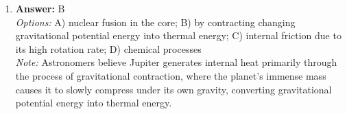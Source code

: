 \documentclass[12pt]{article}
\begin{document}
\begin{enumerate}[label=\arabic*.]
\\ \textit{Note:} Jupiter's magnetic field does not switch polarity every 11 years; instead, it has a stable magnetic field that differs from the solar magnetic cycle, which is characterized by the Sun's magnetic field reversing approximately every 11 years.
\item \textbf{Answer:} B
\\ \textit{Options:} A) nuclear fusion in the core; B) by contracting changing gravitational potential energy into thermal energy; C) internal friction due to its high rotation rate; D) chemical processes
\\ \textit{Note:} Astronomers believe Jupiter generates internal heat primarily through the process of gravitational contraction, where the planet's immense mass causes it to slowly compress under its own gravity, converting gravitational potential energy into thermal energy.
\end{enumerate}
\end{document}
